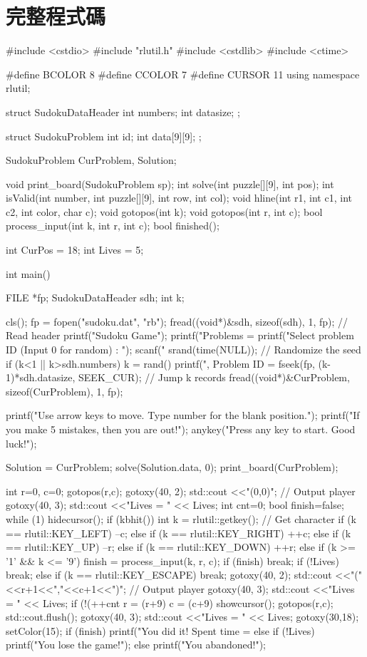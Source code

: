 \documentclass[12pt,a4paper]{article}
\begin{document}
\section{完整程式碼}
\begin{cppcode}
#include <cstdio>
#include "rlutil.h"
#include <cstdlib>
#include <ctime>

#define BCOLOR 8
#define CCOLOR 7
#define CURSOR 11
using namespace rlutil;

struct SudokuDataHeader {
	int numbers;
	int datasize;
};

struct SudokuProblem {
	int id;
	int data[9][9];
};

SudokuProblem CurProblem, Solution;

void print_board(SudokuProblem sp);
int solve(int puzzle[][9], int pos);
int isValid(int number, int puzzle[][9], int row, int col);
void hline(int r1, int c1, int c2, int color, char c);
void gotopos(int k);
void gotopos(int r, int c);
bool process_input(int k, int r, int c);
bool finished();

int CurPos = 18;
int Lives = 5;

int main()
{
	FILE *fp;
	SudokuDataHeader sdh;
	int k;
	
	cls();
	fp = fopen("sudoku.dat", "rb");
	fread((void*)&sdh, sizeof(sdh),  1, fp); // Read header
	printf("\n\nMy Sudoku Game\n\n");
	printf("\nTotal Problems = %
	printf("Select problem ID (Input 0 for random) : ");
	scanf("%
	srand(time(NULL)); // Randomize the seed
	if (k<1 || k>sdh.numbers) k = rand() %
	printf("\n\nOK, Problem ID = %
	fseek(fp, (k-1)*sdh.datasize, SEEK_CUR); // Jump k records
	fread((void*)&CurProblem, sizeof(CurProblem), 1, fp);
	
	printf("Use arrow keys to move. Type number for the blank position.\n");
	printf("If you make 5 mistakes, then you are out!\n");
	anykey("Press any key to start. Good luck!");
	
	Solution = CurProblem;
	solve(Solution.data, 0);
	print_board(CurProblem);
	
	int r=0, c=0;
	gotopos(r,c);
	gotoxy(40, 2); std::cout <<"(0,0)"; // Output player
	gotoxy(40, 3); std::cout <<"Lives = " << Lives;
	int cnt=0;
	bool finish=false;
	while (1) {
		hidecursor();
		if (kbhit()) {
			int k = rlutil::getkey(); // Get character
			if (k == rlutil::KEY_LEFT) --c;
			else if (k == rlutil::KEY_RIGHT) ++c;
			else if (k == rlutil::KEY_UP) --r;
			else if (k == rlutil::KEY_DOWN) ++r;
			else if (k >= '1' && k <= '9') {
				finish = process_input(k, r, c);
				if (finish) break;
				if (!Lives) break;
			} else if (k == rlutil::KEY_ESCAPE) break;
			gotoxy(40, 2); std::cout <<"("<<r+1<<","<<c+1<<")"; // Output player
			gotoxy(40, 3); std::cout <<"Lives = " << Lives;
		}
		if (!(++cnt%
		r = (r+9) %
		c = (c+9) %
		showcursor();
		gotopos(r,c);
		std::cout.flush();
	}
	gotoxy(40, 3); std::cout <<"Lives = " << Lives;
	gotoxy(30,18);
	setColor(15);
	if (finish) printf("You did it! Spent time = %
	else if (!Lives) printf("You lose the game!\n\n");
	else printf("You abandoned!\n\n");
	
}
\end{cppcode}
\end{document}
